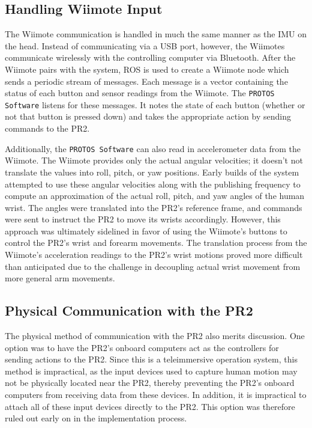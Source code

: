 \documentclass{sig-alternate}
\begin{document}
\subsection{Handling Wiimote Input}
The Wiimote communication is handled in much the same manner as the IMU on the head.
Instead of communicating via a USB port, however, the Wiimotes communicate wirelessly with the
controlling computer via Bluetooth. After the Wiimote pairs with the system,
ROS is used to create a Wiimote node which 
sends a periodic stream of messages. Each message is a vector containing the
status of each button and sensor readings from the Wiimote. The {\tt PROTOS Software}
listens for these messages. It notes the state of each button (whether or not that button
is pressed down)
and takes the appropriate action by sending commands to the PR2. 

\indent Additionally,  the {\tt PROTOS Software} can also read in accelerometer data from the Wiimote. The Wiimote
provides only the actual angular velocities; it doesn't not translate the 
values into roll, pitch, or yaw positions. Early builds of the system attempted to use these angular velocities along 
with the publishing frequency to compute an approximation of the actual roll, pitch,
and yaw angles of the human wrist. The angles were translated into the PR2's
reference frame, and commands were sent to instruct the PR2 to move its wrists accordingly. However,
this approach was ultimately sidelined in favor of using the Wiimote's buttons to control the PR2's
wrist and forearm movements. The translation process from the Wiimote's acceleration readings to the PR2's
wrist motions proved more difficult than anticipated due to the challenge in decoupling actual wrist movement
from more general arm movements.

\subsection{Physical Communication with the PR2}
\indent The physical method of
communication with the PR2 also merits discussion. One option was to have the PR2's onboard computers
act as the controllers for sending actions to the PR2. Since this is a teleimmersive operation system, this method is impractical, 
as the input devices used to capture human motion may not be physically located
near the PR2, thereby preventing the PR2's onboard computers from receiving data from these devices. 
In addition, it is impractical to attach all of these input devices 
directly to the PR2. This option was therefore ruled out early on in the implementation process. 
\end{document}
